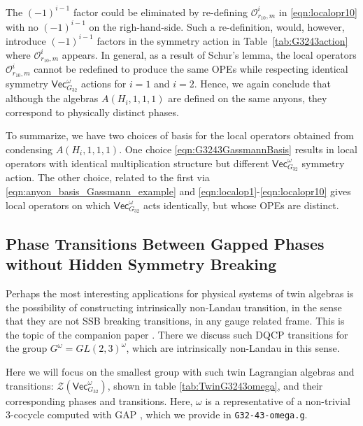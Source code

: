 \documentclass[aps,twocolumn,prx,floatfix,preprintnumbers, nofootinbib,10pt]{revtex4-2}
\numberwithin{equation}{section}
\theoremstyle{definition}
\newcommand{\cO}{\mathcal{O}}
\newcommand{\cZ}{\mathcal{Z}}
\renewcommand{\Vec}{\mathsf{Vec}}
\begin{document}
The $(-1)^{i-1}$ factor could be eliminated by re-defining $\cO^i_{r_{10},m}$ in \eqref{eqn:localopr10} with no $(-1)^{i-1}$ on the righ-hand-side. Such a re-definition, would, however, introduce $(-1)^{i-1}$ factors in the symmetry action in Table~\ref{tab:G3243action} where $\cO^i_{r_{10},m}$ appears. In general, as a result of Schur's lemma, the local operators $\cO^i_{r_{10},m}$ cannot be redefined to produce the same OPEs while respecting identical symmetry $\Vec_{G_{32}}^\omega$ actions for $i=1$ and $i=2$. Hence, we again conclude that although the algebras $A(H_i,1,1,1)$ are defined on the same anyons, they correspond to physically distinct phases.

To summarize, we have two choices of basis for the local operators obtained from condensing $A(H_i,1,1,1)$. One choice \eqref{eqn:G3243GassmannBasis} results in local operators with identical multiplication structure but different $\Vec_{G_{32}}^\omega$ symmetry action. The other choice, related to the first via \eqref{eqn:anyon_basis_Gassmann_example} and \eqref{eqn:localop1}-\eqref{eqn:localopr10} gives local operators on which $\Vec_{G_{32}}^\omega$ acts identically, but whose OPEs are distinct. 



\subsection{Phase Transitions Between Gapped Phases without Hidden Symmetry Breaking}

Perhaps the most interesting applications for physical systems of twin algebras is the possibility of constructing intrinsically non-Landau transition, in the sense that they are not SSB breaking transitions, in any gauge related frame. This is the topic of the companion paper \cite{WGS}. There we discuss such DQCP transitions for the group $G^\omega= GL(2,3)^\omega$, which are intrinsically non-Landau in this sense.

Here we will focus on the smallest group with such twin Lagrangian algebras and transitions:  $\cZ(\Vec_{G_{32}}^\omega)$, shown in table \ref{tab:TwinG3243omega}, and their corresponding phases and transitions. 
Here, $\omega$ is a representative of a non-trivial 3-cocycle computed with GAP \cite{GAP4,HAP,mignard2017moritaequivalencepointedfusion}, which we provide in \texttt{G32-43-omega.g}. 
\end{document}
